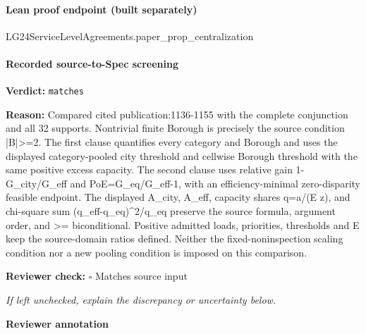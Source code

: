 \documentclass[10pt]{article}
\newcommand{\reviewerbox}{%
  \par\noindent\fbox{\parbox{0.96\linewidth}{\rule{0pt}{0.38in}}}\par
}
\newcommand{\reviewmatch}[1]{%
  \par\noindent\textbf{Reviewer check:} $\square$\; #1\par
  \noindent\emph{If left unchecked, explain the discrepancy or uncertainty below.}\par
}
\begin{document}
\paragraph{Lean proof endpoint (built separately)}\begin{ReviewVerbatim}
LG24ServiceLevelAgreements.paper_prop_centralization
\end{ReviewVerbatim}

\paragraph{Recorded source-to-Spec screening}
\textbf{Verdict:} \texttt{matches}
\\
{\raggedright
\textbf{Reason:} Compared cited publication:\allowbreak{}1136-\allowbreak{}1155 with the complete conjunction and all 32 supports.\allowbreak{} Nontrivial finite Borough is precisely the source condition |B|>=2.\allowbreak{} The first clause quantifies every category and Borough and uses the displayed category-\allowbreak{}pooled city threshold and cellwise Borough threshold with the same positive excess capacity.\allowbreak{} The second clause uses relative gain 1-\allowbreak{}G\_\allowbreak{}city/\allowbreak{}G\_\allowbreak{}eff and PoE=G\_\allowbreak{}eq/\allowbreak{}G\_\allowbreak{}eff-\allowbreak{}1, with an efficiency-\allowbreak{}minimal zero-\allowbreak{}disparity feasible endpoint.\allowbreak{} The displayed A\_\allowbreak{}city, A\_\allowbreak{}eff, capacity shares q=a/\allowbreak{}(E z), and chi-\allowbreak{}square sum (q\_\allowbreak{}eff-\allowbreak{}q\_\allowbreak{}eq)\textasciicircum{}2/\allowbreak{}q\_\allowbreak{}eq preserve the source formula, argument order, and >= biconditional.\allowbreak{} Positive admitted loads, priorities, thresholds and E keep the source-\allowbreak{}domain ratios defined.\allowbreak{} Neither the fixed-\allowbreak{}noninspection scaling condition nor a new pooling condition is imposed on this comparison.\allowbreak{}
\par}
\reviewmatch{Matches source input}
\noindent\textbf{Reviewer annotation}\par
\reviewerbox
\end{document}
